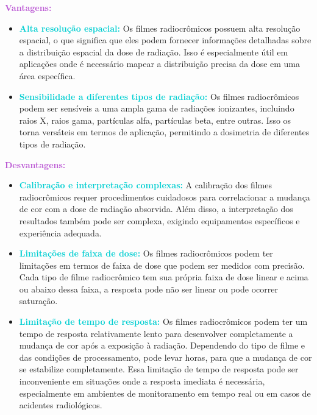 \documentclass[11pt,a4paper]{article}
\begin{document}
	\begin{tcolorbox}[width=\textwidth, colback={white}, colbacktitle={DarkTurquoise!50!white}, title={$\bigstar$ \LobsterTwo{Filme Radiocrômico} $\bigstar$}, coltitle={CarnationPink}, colframe={DarkTurquoise}, fonttitle=\rmfamily\bfseries\Large, breakable]

		\textcolor{MediumOrchid}{\Large\LobsterTwo\textbf{Vantagens:}}
		\begin{itemize}[label=\textcolor{CarnationPink}{$\blacktriangleright$}]
			\item \textcolor{DarkTurquoise}{\textbf{Alta resolução espacial:}} Os filmes radiocrômicos possuem alta resolução espacial, o que significa que eles podem fornecer informações detalhadas sobre a distribuição espacial da dose de radiação. Isso é especialmente útil em aplicações onde é necessário mapear a distribuição precisa da dose em uma área específica.
			\item \textcolor{DarkTurquoise}{\textbf{Sensibilidade a diferentes tipos de radiação:}} Os filmes radiocrômicos podem ser sensíveis a uma ampla gama de radiações ionizantes, incluindo raios X, raios gama, partículas alfa, partículas beta, entre outras. Isso os torna versáteis em termos de aplicação, permitindo a dosimetria de diferentes tipos de radiação.
			\end{itemize}
		\textcolor{MediumOrchid}{\Large\LobsterTwo\textbf{Desvantagens:}}

		\begin{itemize}[label=\textcolor{CarnationPink}{$\blacktriangleright$}]
			\item \textcolor{DarkTurquoise}{\textbf{Calibração e interpretação complexas:}} A calibração dos filmes radiocrômicos requer procedimentos cuidadosos para correlacionar a mudança de cor com a dose de radiação absorvida. Além disso, a interpretação dos resultados também pode ser complexa, exigindo equipamentos específicos e experiência adequada.
			\item \textcolor{DarkTurquoise}{\textbf{Limitações de faixa de dose:}} Os filmes radiocrômicos podem ter limitações em termos de faixa de dose que podem ser medidos com precisão. Cada tipo de filme radiocrômico tem sua própria faixa de dose linear e acima ou abaixo dessa faixa, a resposta pode não ser linear ou pode ocorrer saturação.
			\item \textcolor{DarkTurquoise}{\textbf{Limitação de tempo de resposta:}} Os filmes radiocrômicos podem ter um tempo de resposta relativamente lento para desenvolver completamente a mudança de cor após a exposição à radiação. Dependendo do tipo de filme e das condições de processamento, pode levar horas, para que a mudança de cor se estabilize completamente. Essa limitação de tempo de resposta pode ser inconveniente em situações onde a resposta imediata é necessária, especialmente em ambientes de monitoramento em tempo real ou em casos de acidentes radiológicos.
		\end{itemize}
	\end{tcolorbox}
\end{document}
